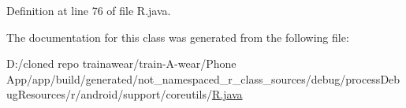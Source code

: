 Definition at line 76 of file R.\+java.



The documentation for this class was generated from the following file\+:\begin{DoxyCompactItemize}
\item 
D\+:/cloned repo trainawear/train-\/\+A-\/wear/\+Phone App/app/build/generated/not\+\_\+namespaced\+\_\+r\+\_\+class\+\_\+sources/debug/process\+Debug\+Resources/r/android/support/coreutils/\mbox{\hyperlink{process_debug_resources_2r_2android_2support_2coreutils_2_r_8java}{R.\+java}}\end{DoxyCompactItemize}
